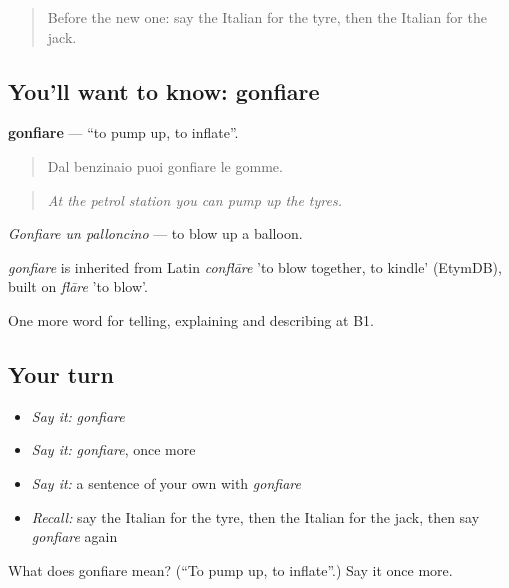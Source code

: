 \label{lesson:IT-C409-gonfiare}



\begin{quote}
Before the new one: say the Italian for the tyre, then the Italian for the jack.
\end{quote}

\subsection*{You'll want to know: gonfiare}
\textbf{gonfiare} — \textquotedblleft{}to pump up, to inflate\textquotedblright{}.

\begin{quote}
Dal benzinaio puoi gonfiare le gomme.
\end{quote}

\begin{quote}
\emph{At the petrol station you can pump up the tyres.}
\end{quote}

\emph{Gonfiare un palloncino} — to blow up a balloon.

\begin{cousinweb}
\emph{gonfiare} is inherited from Latin \emph{conflāre} 'to blow together, to kindle' (EtymDB), built on \emph{flāre} 'to blow'.
\end{cousinweb}

\begin{grammarlens}[title={What you've built}]
One more word for telling, explaining and describing at B1.
\end{grammarlens}

\subsection*{Your turn}
\begin{itemize}
\raggedright
  \item \emph{Say it:} \emph{gonfiare}
  \item \emph{Say it:} \emph{gonfiare}, once more
  \item \emph{Say it:} a sentence of your own with \emph{gonfiare}
  \item \emph{Recall:} say the Italian for the tyre, then the Italian for the jack, then say \emph{gonfiare} again
\end{itemize}

\begin{tcolorbox}[breakable,colback=teal!4,colframe=teal!35!black,title={Before you move on}]
What does gonfiare mean? (\textquotedblleft{}To pump up, to inflate\textquotedblright{}.) Say it once more.
\end{tcolorbox}
